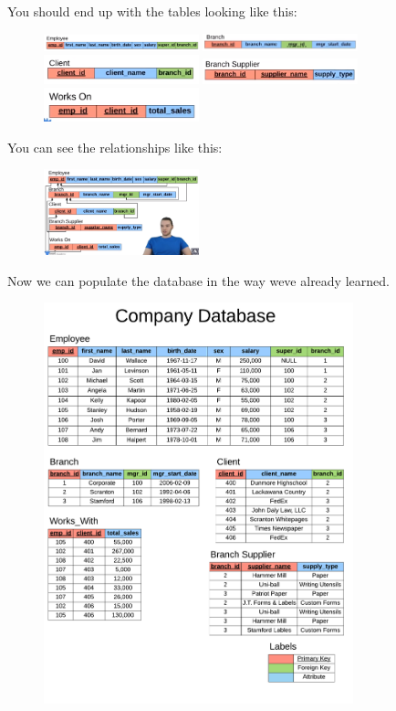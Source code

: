 You should end up with the tables looking like this:
\begin{figure}[H]
    \centering
    \includegraphics[width=0.4\textwidth]{./Figs/2020-12-24-23-32-40.png}
    \includegraphics[width=0.4\textwidth]{./Figs/2020-12-24-23-14-01.png}
    \includegraphics[width=0.4\textwidth]{./Figs/2020-12-24-23-14-09.png}
    \includegraphics[width=0.4\textwidth]{./Figs/2020-12-24-23-14-17.png}
    \includegraphics[width=0.4\textwidth]{./Figs/2020-12-24-23-33-07.png}
\end{figure}
You can see the relationships like this:
\begin{figure}[H]
    \centering
    \includegraphics[width=0.4\textwidth]{./Figs/2020-12-24-23-34-55.png}
\end{figure}

Now we can populate the database in the way weve already learned.
\begin{figure}[H]
    \centering
    \includegraphics[width=0.8\textwidth]{./Classes/company-database.pdf}
\end{figure}

